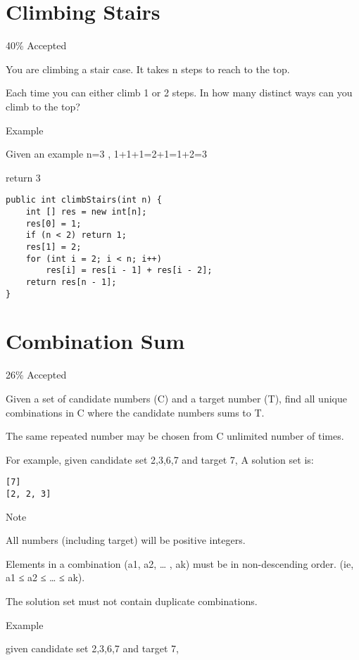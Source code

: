 \documentclass[9pt, b5paaper]{book}
\begin{document}
\section{Climbing Stairs}
\label{sec-1-21}

40\% Accepted

You are climbing a stair case. It takes n steps to reach to the top.

Each time you can either climb 1 or 2 steps. In how many distinct ways can you climb to the top?

Example

Given an example n=3 , 1+1+1=2+1=1+2=3

return 3

\begin{verbatim}
public int climbStairs(int n) {
    int [] res = new int[n];
    res[0] = 1;
    if (n < 2) return 1;
    res[1] = 2;
    for (int i = 2; i < n; i++) 
        res[i] = res[i - 1] + res[i - 2];
    return res[n - 1];
}
\end{verbatim}
\section{Combination Sum}
\label{sec-1-22}

26\% Accepted

Given a set of candidate numbers (C) and a target number (T), find all unique combinations in C where the candidate numbers sums to T.

The same repeated number may be chosen from C unlimited number of times.



For example, given candidate set 2,3,6,7 and target 7, 
A solution set is: 
\begin{verbatim}
[7] 
[2, 2, 3]
\end{verbatim}

Note

All numbers (including target) will be positive integers.

Elements in a combination (a1, a2, … , ak) must be in non-descending order. (ie, a1 ≤ a2 ≤ … ≤ ak).

The solution set must not contain duplicate combinations.

Example

given candidate set 2,3,6,7 and target 7, 
\end{document}
